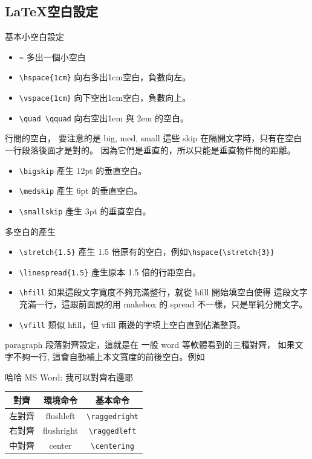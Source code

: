 \subsection{\LaTeX 空白設定}
基本小空白設定
\begin{itemize}
\item \verb=~= 多出一個小空白
\item \verb=\hspace{1cm}= 向右多出1cm空白，負數向左。
\item \verb=\vspace{1cm}= 向下空出1cm空白，負數向上。
\item \verb=\quad \qquad= 向右空出1em 與 2em 的空白。
\end{itemize}
行間的空白， 要注意的是 big, med, small 這些 skip 在隔開文字時，只有在空白
一行段落後面才是對的。 因為它們是垂直的，所以只能是垂直物件間的距離。
\begin{itemize}
\item \verb=\bigskip= 產生 12pt 的垂直空白。
\item \verb=\medskip= 產生 6pt 的垂直空白。
\item \verb=\smallskip= 產生 3pt 的垂直空白。
\end{itemize}
多空白的產生
\begin{itemize}
\item \verb=\stretch{1.5}= 產生 1.5 倍原有的空白，例如\verb=\hspace{\stretch{3}}=
\item \verb=\linespread{1.5}= 產生原本 1.5 倍的行距空白。
\item \verb=\hfill= 如果這段文字寬度不夠充滿整行，就從 hfill 開始填空白使得
這段文字充滿一行，這跟前面說的用 makebox 的 spread 不一樣，只是單純分開文字。
\item \verb=\vfill= 類似 hfill，但 vfill 兩邊的字填上空白直到佔滿整頁。
\end{itemize} 
paragraph 段落對齊設定，這就是在 一般 word 等軟體看到的三種對齊，
如果文字不夠一行, 這會自動補上本文寬度的前後空白。例如
\begin{flushright}
哈哈 MS Word: 我可以對齊右邊耶
\end{flushright}
\begin{center}
\begin{tabular}{ccc}
對齊 & 環境命令  & 基本命令\\
\hline
左對齊 & flushleft & \verb=\raggedright= \\
右對齊 & flushright & \verb=\raggedleft= \\
中對齊 & center & \verb=\centering= \\
\end{tabular}
\end{center}
